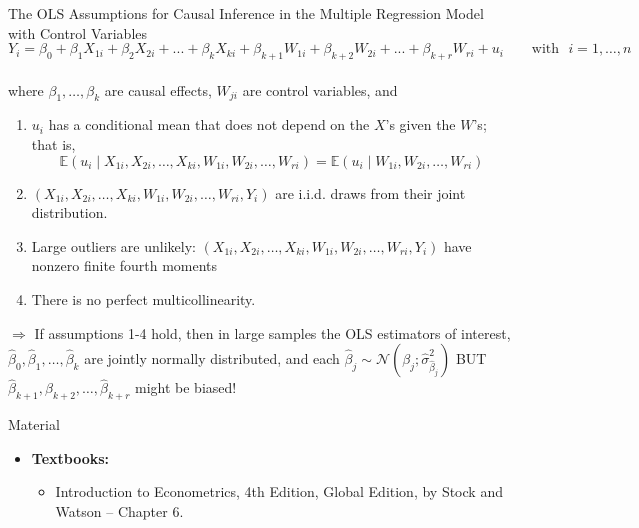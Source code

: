 \documentclass[notes,10pt, aspectratio=169]{beamer}
\begin{document}
\begin{frame}{The OLS Assumptions for Causal Inference
in the Multiple Regression Model with Control Variables}
\begin{equation*}
    Y_i = \beta_{0} + \beta_1 X_{1i} + \beta_2 X_{2i} + ... + \beta_k X_{ki} + \beta_{k+1} W_{1i} + \beta_{k+2} W_{2i} + ... + \beta_{k+r} W_{ri} + u_i \text{~~~~~~with~~} i=1,\dots, n
\end{equation*}\\
\vspace{.5cm}
where $\beta_1, \dots, \beta_k$ are causal effects,  $W_{ji}$ are control variables, and\vspace{.5cm}

\begin{enumerate}
    \item $u_i$ has a conditional mean that does not depend on the $X$’s given the $W$’s; that is,
    \begin{equation*}
        \mathbb{E}(u_i \mid X_{1i}, X_{2i}, \dots, X_{ki},  W_{1i},  W_{2i}, \dots,  W_{ri})=\mathbb{E}(u_i \mid W_{1i},  W_{2i}, \dots,  W_{ri})
    \end{equation*}
    \item $(X_{1i}, X_{2i}, \dots, X_{ki},  W_{1i},  W_{2i}, \dots,  W_{ri}, Y_i)$ are i.i.d. draws from their joint distribution.
    \item Large outliers are unlikely: $(X_{1i}, X_{2i}, \dots, X_{ki},  W_{1i},  W_{2i}, \dots,  W_{ri}, Y_i)$ have nonzero finite fourth moments
    \item There is no perfect multicollinearity.
\end{enumerate}
\vspace{.3cm}
$\Rightarrow$ If assumptions 1-4 hold, then in large samples the OLS estimators of interest, $\hat{\beta}_0, \hat{\beta}_1, \dots, \hat{\beta}_k$ are jointly normally distributed, and each $\hat{\beta}_j\sim \mathcal{N}(\beta_j; \hat{\sigma}^2_{\hat{\beta}_j})$ BUT $\hat{\beta}_{k+1}, \hat{\beta}_{k+2}, \dots, \hat{\beta}_{k+r}$ might be biased!
\end{frame}

\begin{frame}[allowframebreaks]{Material}
\begin{itemize}
    \item[--] \textbf{Textbooks:}
    \begin{itemize}
        \item Introduction to Econometrics, 4th Edition, Global Edition, by Stock and Watson -- Chapter 6.
    \end{itemize}
\end{itemize}
\end{frame}
\end{document}
